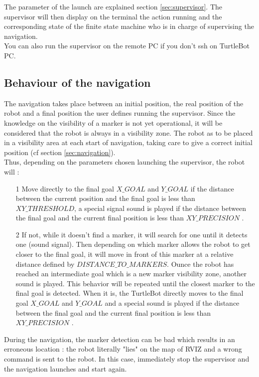 \documentclass[10pt,a4paper]{article}
\begin{document}
The parameter of the launch are explained section \ref{sec:supervisor}. The supervisor will then display on the terminal the action running and the corresponding state of the finite state machine who is in charge of supervising the navigation.\\

You can also run the supervisor on the remote PC if you don't ssh on TurtleBot PC.



\subsection{Behaviour of the navigation}
\label{sec:behaviourOfTheNavigation}

The navigation takes place between an initial position, the real position of the robot and a final position the user defines running the supervisor. Since the knowledge on the visibility of a marker is not yet operational, it will be considered that the robot is always in a visibility zone. The robot as to be placed in a visibility area at each start of navigation, taking care to give a correct initial position (cf section \ref{sec:navigation}).\\

Thus, depending on the parameters chosen launching the supervisor, the robot will :

\begin{itemize}
\item[1] Move directly to the final goal $X\_GOAL$ and $Y\_GOAL$ if the distance between the current position and the final goal is less than  $XY\_THRESHOLD$, a special signal sound is played if the distance between the final goal and the current final position is less than $XY\_PRECISION$ .
\item[2] If not, while it doesn't find a marker, it will search for one until it detects one (sound signal). Then depending on which marker allows the robot to get closer to the final goal, it will move in front of this marker at a relative distance defined by $DISTANCE\_TO\_MARKERS$. Ounce the robot has reached an intermediate goal which is a new marker visibility zone, another sound is played. This behavior will be repeated until the closest marker to the final goal is detected. When it is, the TurtleBot directly moves to the final goal $X\_GOAL$ and $Y\_GOAL$ and a special sound is played if the distance between the final goal and the current final position is less than $XY\_PRECISION$ .
\end{itemize}

During the navigation, the marker detection can be bad which results in an erroneous location : the robot literally "lies" on the map of RVIZ and a wrong command is sent to the robot. In this case, immediately stop the supervisor and the navigation launches and start again.
\end{document}
